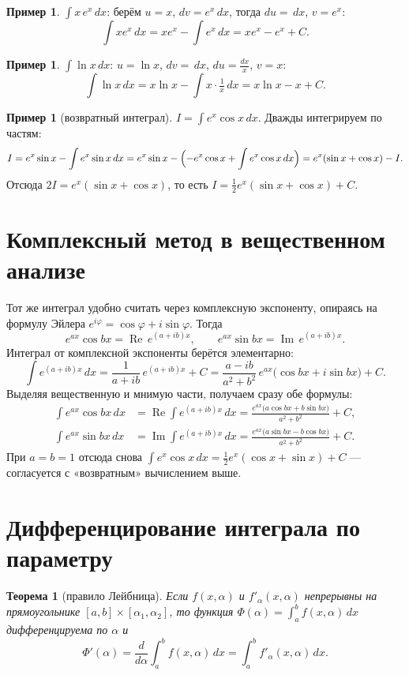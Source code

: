 \documentclass[11pt,a4paper]{article}
\theoremstyle{definition}
\newtheorem{example}[definition]{Пример}
\theoremstyle{plain}
\newtheorem{theorem}[definition]{Теорема}
\newcommand{\dx}{\,dx}
\renewcommand{\Re}{\operatorname{Re}}
\renewcommand{\Im}{\operatorname{Im}}
\begin{document}
\begin{example}
$\displaystyle\int x\,e^{x}\dx$: берём $u=x$, $dv=e^x\dx$, тогда $du=\dx$, $v=e^x$:
\[
  \int x e^{x}\dx=xe^{x}-\int e^{x}\dx=xe^{x}-e^{x}+C.
\]
\end{example}

\begin{example}
$\displaystyle\int\ln x\dx$: $u=\ln x$, $dv=\dx$, $du=\tfrac{dx}{x}$, $v=x$:
\[
  \int\ln x\dx=x\ln x-\int x\cdot\tfrac1x\dx=x\ln x-x+C.
\]
\end{example}

\begin{example}[возвратный интеграл]
$\displaystyle I=\int e^{x}\cos x\dx$. Дважды интегрируем по частям:
\[
  I=e^{x}\sin x-\int e^{x}\sin x\dx
   =e^{x}\sin x-\Bigl(-e^{x}\cos x+\int e^{x}\cos x\dx\Bigr)
   =e^{x}(\sin x+\cos x)-I.
\]
Отсюда $2I=e^{x}(\sin x+\cos x)$, то есть $I=\tfrac12 e^{x}(\sin x+\cos x)+C$.
\end{example}

\section{Комплексный метод в вещественном анализе}

Тот же интеграл удобно считать через комплексную экспоненту, опираясь на формулу Эйлера
$e^{i\varphi}=\cos\varphi+i\sin\varphi$. Тогда
\[
  e^{ax}\cos bx=\Re\,e^{(a+ib)x},\qquad e^{ax}\sin bx=\Im\,e^{(a+ib)x}.
\]
Интеграл от комплексной экспоненты берётся элементарно:
\[
  \int e^{(a+ib)x}\dx=\frac{1}{a+ib}\,e^{(a+ib)x}+C
   =\frac{a-ib}{a^2+b^2}\,e^{ax}\bigl(\cos bx+i\sin bx\bigr)+C.
\]
Выделяя вещественную и мнимую части, получаем сразу обе формулы:
\begin{align*}
  \int e^{ax}\cos bx\dx &= \Re\!\int e^{(a+ib)x}\dx
     =\frac{e^{ax}\bigl(a\cos bx+b\sin bx\bigr)}{a^2+b^2}+C,\\[4pt]
  \int e^{ax}\sin bx\dx &= \Im\!\int e^{(a+ib)x}\dx
     =\frac{e^{ax}\bigl(a\sin bx-b\cos bx\bigr)}{a^2+b^2}+C.
\end{align*}
При $a=b=1$ отсюда снова $\int e^{x}\cos x\dx=\tfrac12 e^{x}(\cos x+\sin x)+C$ — согласуется с
«возвратным» вычислением выше.

\section{Дифференцирование интеграла по параметру}

\begin{theorem}[правило Лейбница]
Если $f(x,\alpha)$ и $f'_{\alpha}(x,\alpha)$ непрерывны на прямоугольнике
$[a,b]\times[\alpha_1,\alpha_2]$, то функция $\Phi(\alpha)=\displaystyle\int_a^b f(x,\alpha)\dx$
дифференцируема по $\alpha$ и
\[
  \Phi'(\alpha)=\frac{d}{d\alpha}\int_a^b f(x,\alpha)\dx=\int_a^b f'_{\alpha}(x,\alpha)\dx .
\]
\end{theorem}
\end{document}
